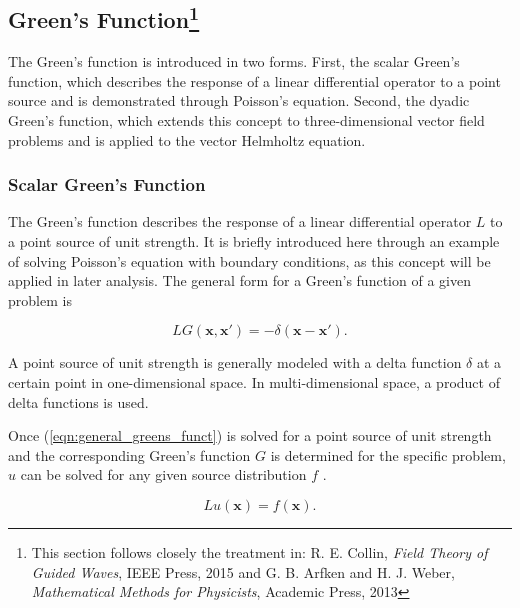 \subsection[Green's Function]{Green's Function\protect\footnote{This section follows closely the treatment in: R. E. Collin, \textit{Field Theory of Guided Waves}, IEEE Press, 2015 and G. B. Arfken and H. J. Weber, \textit{Mathematical Methods for Physicists}, Academic Press, 2013}}\label{sec:green}


The Green's function is introduced in two forms. First, the scalar Green's function, which describes the response of a linear differential 
operator to a point source and is demonstrated through Poisson's equation. Second, the 
dyadic Green's function, which extends this concept to three-dimensional vector 
field problems and is applied to the vector Helmholtz equation.

\subsubsection{Scalar Green's Function}\label{sec:scal_green}

The Green's function describes the response of a linear differential operator $L$ to a point source of unit strength. It is briefly introduced here through an example of solving Poisson's equation with boundary conditions, as this concept will be applied in later analysis. The general form for a Green's function of a given problem is \cite[p.~512]{Arfken_Weber_Harris_2013}

\begin{equation}
    LG(\mathbf{x},\mathbf{x'}) = -\delta(\mathbf{x}-\mathbf{x'}).
    \label{eqn:general_greens_funct}
\end{equation}

A point source of unit strength is generally modeled with a delta function $\delta$ at a certain point in one-dimensional space. In multi-dimensional space, a product of delta functions is used.

Once (\ref{eqn:general_greens_funct}) is solved for a point source of unit strength and the corresponding Green’s function $G$ is determined for the specific problem, $u$ can be solved for any given source distribution $f$ \cite[p.~512]{Arfken_Weber_Harris_2013}.

\begin{equation}
    Lu(\mathbf{x}) = f(\mathbf{x}).
    \label{eqn:examplary_function_with_operator}
\end{equation}

